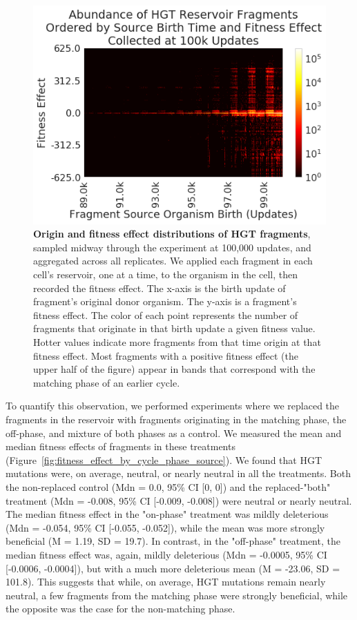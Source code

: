 \documentclass[PhD]{msu-thesis}
\begin{document}
	\begin{figure}[h!]
	\begin{center}
	\includegraphics[width=0.75\columnwidth]{figures/HGT/fitness_effect_heatmap.png}
	\caption{\textbf{Origin and fitness effect distributions of HGT fragments}, sampled midway through the experiment at 100,000 updates, and aggregated across all replicates. We applied each fragment in each cell's reservoir, one at a time, to the organism in the cell, then recorded the fitness effect. The x-axis is the birth update of fragment's original donor organism. The y-axis is a fragment's fitness effect. The color of each point represents the number of fragments that originate in that birth update a given fitness value. Hotter values indicate more fragments from that time origin at that fitness effect. Most fragments with a positive fitness effect (the upper half of the figure) appear in bands that correspond with the matching phase of an earlier cycle. 
	}\label{fig:fitness_effect_heatmap}
	\end{center}
	\end{figure}


To quantify this observation, we performed experiments where we replaced the fragments in the reservoir with fragments originating in the matching phase, the off-phase, and mixture of both phases as a control. We measured the mean and median fitness 
effects of fragments in these treatments (Figure~\ref{fig:fitness_effect_by_cycle_phase_source}). We found that HGT mutations were, on average, neutral, or nearly neutral in all the treatments. Both the non-replaced control (Mdn = 0.0, 95\% CI [0, 0]) and the replaced-"both" treatment (Mdn = -0.008, 95\% CI [-0.009, -0.008]) were neutral or nearly neutral. The median fitness effect in the "on-phase" treatment was mildly deleterious (Mdn = -0.054, 95\% CI [-0.055, -0.052]), while the mean was more strongly beneficial (M = 1.19, SD = 19.7). In contrast, in the "off-phase" treatment, the median fitness effect was, again, mildly deleterious (Mdn = -0.0005, 95\% CI [-0.0006, -0.0004]), but with a much more deleterious mean (M = -23.06, SD = 101.8). This suggests that while, on average, HGT mutations remain nearly neutral, a few fragments from the matching phase were strongly beneficial, while the opposite was the case for the non-matching phase.
\end{document}
